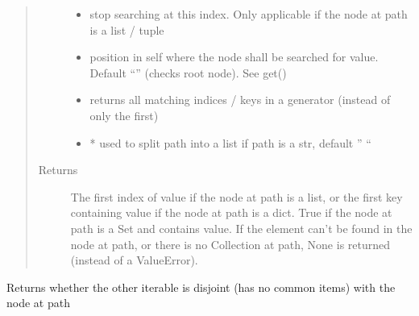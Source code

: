 \documentclass[a4paper,10pt,english]{sphinxmanual}
\begin{document}
\begin{fulllineitems}
\begin{fulllineitems}
\begin{quote}
\begin{description}
\begin{itemize}
\item {}
\sphinxAtStartPar
{} \textendash{} stop searching at this index. Only applicable if the node at path is a list / tuple

\item {}
\sphinxAtStartPar
{} \textendash{} position in self where the node shall be searched for value. Default “” (checks root node). See get()

\item {}
\sphinxAtStartPar
{} \textendash{} returns all matching indices / keys in a generator (instead of only the first)

\item {}
\sphinxAtStartPar
{} \textendash{} * used to split path into a list if path is a str, default ” “

\end{itemize}

\item[{Returns}] \leavevmode
\sphinxAtStartPar
The first index of value if the node at path is a list, or the first key containing value if the node at
path is a dict. True if the node at path is a Set and contains value. If the element can’t be found in the
node at path, or there is no Collection at path, None is returned (instead of a ValueError).

\end{description}\end{quote}

\end{fulllineitems}


\begin{fulllineitems}
\label{\detokenize{fagus.fagus:fagus.fagus.Fagus.isdisjoint}}
\pysigstartsignatures
{}
\pysigstopsignatures
\sphinxAtStartPar
Returns whether the other iterable is disjoint (has no common items) with the node at path


\end{fulllineitems}
\end{fulllineitems}
\end{document}
